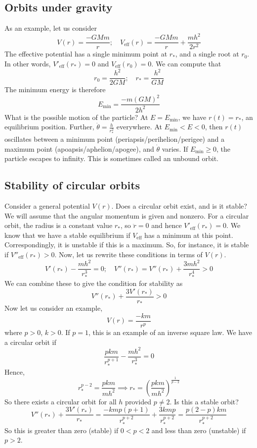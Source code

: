 \subsection{Orbits under gravity}
As an example, let us consider
\[
	V(r) = \frac{-GMm}{r};\quad V_\text{eff}(r) = \frac{-GMm}{r} + \frac{mh^2}{2r^2}
\]
The effective potential has a single minimum point at \(r_\ast\), and a single root at \(r_0\).
In other words, \(V'_\text{eff}(r_\ast) = 0\) and \(V_\text{eff}(r_0) = 0\).
We can compute that
\[
	r_0 = \frac{h^2}{2GM};\quad r_\ast = \frac{h^2}{GM}
\]
The minimum energy is therefore
\[
	E_\text{min} = \frac{-m(GM)^2}{2h^2}
\]
What is the possible motion of the particle?
At \(E = E_\text{min}\), we have \(r(t) = r_\ast\), an equilibrium position.
Further, \(\dot\theta = \frac{h}{r_\ast^2}\) everywhere.
At \(E_\text{min} < E < 0\), then \(r(t)\) oscillates between a minimum point (periapsis/perihelion/perigee) and a maximum point (apoapsis/aphelion/apogee), and \(\dot\theta\) varies.
If \(E_\text{min} \geq 0\), the particle escapes to infinity.
This is sometimes called an unbound orbit.

\subsection{Stability of circular orbits}
Consider a general potential \(V(r)\).
Does a circular orbit exist, and is it stable?
We will assume that the angular momentum is given and nonzero.
For a circular orbit, the radius is a constant value \(r_\ast\), so \(\ddot r = 0\) and hence \(V'_\text{eff}(r_\ast) = 0\).
We know that we have a stable equilibrium if \(V_\text{eff}\) has a minimum at this point.
Correspondingly, it is unstable if this is a maximum.
So, for instance, it is stable if \(V''_\text{eff}(r_\ast) > 0\).
Now, let us rewrite these conditions in terms of \(V(r)\).
\[
	V'(r_\ast) - \frac{mh^2}{r_\ast^3} = 0;\quad V''(r_\ast) = V''(r_\ast) + \frac{3mh^2}{r_\ast^4} > 0
\]
We can combine these to give the condition for stability as
\[
	V''(r_\ast) + \frac{3V'(r_\ast)}{r_\ast} > 0
\]
Now let us consider an example,
\[
	V(r) = \frac{-km}{r^p}
\]
where \(p>0\), \(k>0\).
If \(p=1\), this is an example of an inverse square law.
We have a circular orbit if
\[
	\frac{pkm}{r_\ast^{p+1}} - \frac{mh^2}{r_\ast^3} = 0
\]
Hence,
\[
	r_\ast^{p-2} = \frac{pkm}{mh^2} \implies r_\ast = \left( \frac{pkm}{mh^2} \right)^{\frac{1}{p-2}}
\]
So there exists a circular orbit for all \(h\) provided \(p \neq 2\).
Is this a stable orbit?
\[
	V''(r_\ast) + \frac{3V'(r_\ast)}{r_\ast} = \frac{-kmp(p+1)}{r_\ast^{p+2}} + \frac{3kmp}{r_\ast^{p+2}} = \frac{p(2-p)km}{r_\ast^{p+2}}
\]
So this is greater than zero (stable) if \(0 < p < 2\) and less than zero (unstable) if \(p > 2\).


